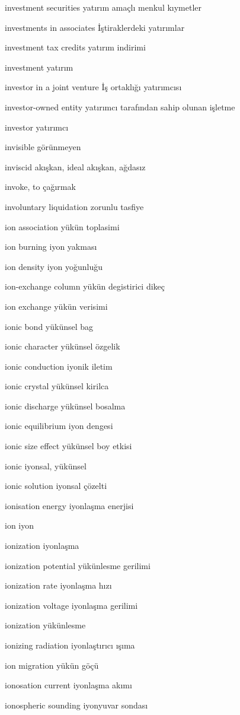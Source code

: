 \documentclass[12pt,fleqn]{article}\usepackage{../../common}
\begin{document}
investment securities yatırım amaçlı menkul kıymetler

investments in associates İştiraklerdeki yatırımlar

investment tax credits yatırım indirimi

investment yatırım

investor in a joint venture İş ortaklığı yatırımcısı

investor-owned entity yatırımcı tarafından sahip olunan işletme

investor yatırımcı

invisible görünmeyen

inviscid akışkan, ideal akışkan, ağdasız

invoke, to çağırmak

involuntary liquidation zorunlu tasfiye

ion association yükün toplasimi

ion burning iyon yakması

ion density iyon yoğunluğu

ion-exchange column yükün degistirici dikeç

ion exchange yükün verisimi

ionic bond yükünsel bag

ionic character yükünsel özgelik

ionic conduction iyonik iletim

ionic crystal yükünsel kirilca

ionic discharge yükünsel bosalma

ionic equilibrium iyon dengesi

ionic size effect yükünsel boy etkisi

ionic iyonsal, yükünsel

ionic solution iyonsal çözelti

ionisation energy iyonlaşma enerjisi

ion iyon

ionization iyonlaşma

ionization potential yükünlesme gerilimi

ionization rate iyonlaşma hızı

ionization voltage iyonlaşma gerilimi

ionization yükünlesme

ionizing radiation iyonlaştırıcı ışıma

ion migration yükün göçü

ionosation current iyonlaşma akımı

ionospheric sounding iyonyuvar sondası
\end{document}
